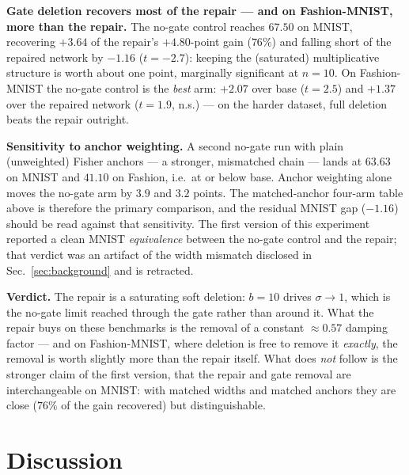 \documentclass[review,12pt,number]{elsarticle}
\begin{document}
\textbf{Gate deletion recovers most of the repair --- and on
Fashion-MNIST, more than the repair.} The no-gate control reaches
$67.50$ on MNIST, recovering $+3.64$ of the repair's $+4.80$-point gain
($76\%$) and falling short of the repaired network by $-1.16$
($t{=}-2.7$): keeping the (saturated) multiplicative structure is worth
about one point, marginally significant at $n{=}10$. On Fashion-MNIST
the no-gate control is the \emph{best} arm: $+2.07$ over base
($t{=}2.5$) and $+1.37$ over the repaired network ($t{=}1.9$, n.s.) ---
on the harder dataset, full deletion beats the repair outright.

\textbf{Sensitivity to anchor weighting.} A second no-gate run with
plain (unweighted) Fisher anchors --- a stronger, mismatched chain ---
lands at $63.63$ on MNIST and $41.10$ on Fashion, i.e.\ at or below
base. Anchor weighting alone moves the no-gate arm by $3.9$ and $3.2$
points. The matched-anchor four-arm table above is therefore the
primary comparison, and the residual MNIST gap ($-1.16$) should be read
against that sensitivity. The first version of this experiment reported
a clean MNIST \emph{equivalence} between the no-gate control and the
repair; that verdict was an artifact of the width mismatch disclosed in
Sec.~\ref{sec:background} and is retracted.

\textbf{Verdict.} The repair is a saturating soft deletion: $b{=}10$
drives $\sigma \to 1$, which is the no-gate limit reached through the
gate rather than around it. What the repair buys on these benchmarks is
the removal of a constant ${\approx}0.57$ damping factor --- and on
Fashion-MNIST, where deletion is free to remove it \emph{exactly}, the
removal is worth slightly more than the repair itself. What does
\emph{not} follow is the stronger claim of the first version, that the
repair and gate removal are interchangeable on MNIST: with matched
widths and matched anchors they are close ($76\%$ of the gain
recovered) but distinguishable.

\section{Discussion}
\label{sec:discussion}
\end{document}

